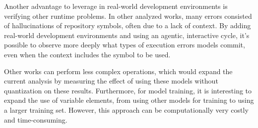 Another advantage to leverage in real-world development environments is verifying other runtime problems. In other analyzed works, many errors consisted of hallucinations of repository symbols, often due to a lack of context. By adding real-world development environments and using an agentic, interactive cycle, it's possible to observe more deeply what types of execution errors models commit, even when the context includes the symbol to be used.

Other works can perform less complex operations, which would expand the current analysis by measuring the effect of using these models without quantization on these results. Furthermore, for model training, it is interesting to expand the use of variable elements, from using other models for training to using a larger training set. However, this approach can be computationally very costly and time-consuming.